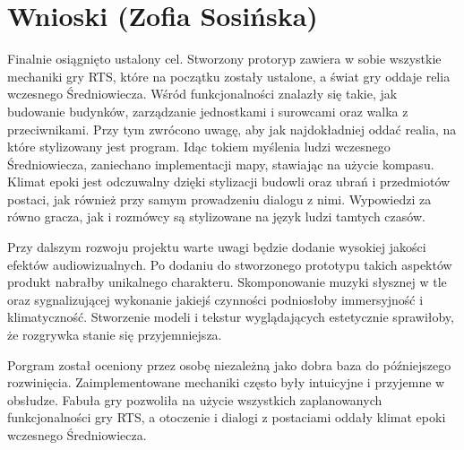 \section{Wnioski (Zofia Sosińska)}
Finalnie osiągnięto ustalony cel. Stworzony protoryp zawiera w sobie wszystkie mechaniki gry RTS,
które na początku zostały ustalone, a świat gry oddaje relia wczesnego Średniowiecza. 
Wśród funkcjonalności znalazły się takie, jak budowanie budynków, zarządzanie
jednostkami i surowcami oraz walka z przeciwnikami. Przy tym zwrócono uwagę, aby jak najdokładniej oddać 
realia, na które stylizowany jest program. Idąc tokiem myślenia ludzi wczesnego Średniowiecza, zaniechano
implementacji mapy, stawiając na użycie kompasu. Klimat epoki jest odczuwalny dzięki stylizacji budowli oraz ubrań i przedmiotów postaci,
jak również przy samym prowadzeniu dialogu z nimi. Wypowiedzi za równo gracza, jak i rozmówcy są stylizowane na język ludzi tamtych czasów.

Przy dalszym rozwoju projektu warte uwagi będzie dodanie wysokiej jakości efektów audiowizualnych. Po dodaniu do stworzonego prototypu takich
aspektów produkt nabrałby unikalnego charakteru. Skomponowanie muzyki słysznej w tle oraz sygnalizującej wykonanie jakiejś czynności podniosłoby immersyjność i klimatyczność.
Stworzenie modeli i tekstur wyglądających estetycznie sprawiłoby, że rozgrywka stanie się przyjemniejsza.

Porgram został oceniony przez osobę niezależną jako dobra baza do późniejszego rozwinięcia. Zaimplementowane mechaniki często były intuicyjne i przyjemne
w obsłudze. Fabuła gry pozwoliła na użycie wszystkich zaplanowanych funkcjonalności gry RTS, a otoczenie i dialogi z postaciami oddały klimat
epoki wczesnego Średniowiecza.
